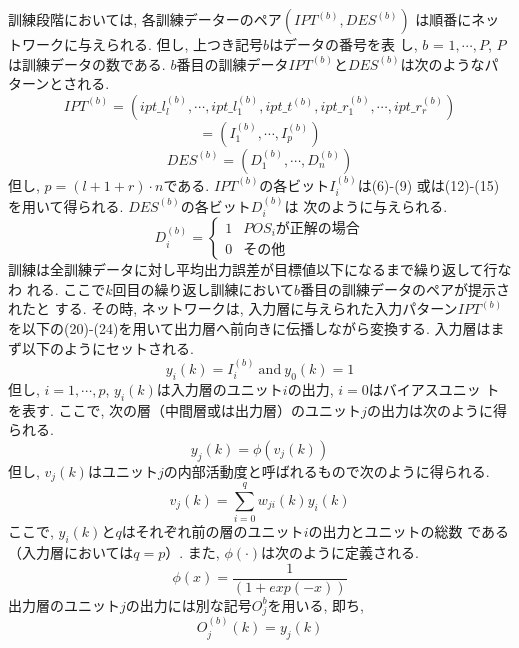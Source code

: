 訓練段階においては, 各訓練データーのペア$(IPT^{(b)}, DES^{(b)})$
は順番にネットワークに与えられる. 但し, 上つき記号$b$はデータの番号を表
し, $b$ = $1, \cdots, P$, $P$は訓練データの数である.
$b$番目の訓練データ$IPT^{(b)}$と$DES^{(b)}$は次のようなパターンとされる.
\[
IPT^{(b)}=(ipt\_l_{l}^{(b)}, \cdots, ipt\_l_{1}^{(b)}, ipt\_t^{(b)},
ipt\_r_{1}^{(b)}, \cdots, ipt\_r_{r}^{(b)})
\]
\begin{equation}
=(I^{(b)}_{1}, \cdots, I^{(b)}_{p})
\end{equation}
\begin{equation}
DES^{(b)}=(D^{(b)}_{1}, \cdots, D^{(b)}_{n})
\end{equation}
但し, $p = (l+1+r) \cdot n$である. $IPT^{(b)}$の各ビット$I^{(b)}_{i}$は(6)-(9)
或は(12)-(15)を用いて得られる.
$DES^{(b)}$の各ビット$D^{(b)}_{i}$は
次のように与えられる.
\begin{equation}
D^{(b)}_{i}=\left\{ \begin{array}{ll}
    1  &  \mbox{$POS_{i}$が正解の場合} \\
    0  &  \mbox{その他}
  \end{array}
\right.
\end{equation}
訓練は全訓練データに対し平均出力誤差が目標値以下になるまで繰り返して行なわ
れる. ここで$k$回目の繰り返し訓練において$b$番目の訓練データのペアが提示されたと
する. その時, ネットワークは, 入力層に与えられた入力パターン$IPT^{(b)}$
を以下の(20)-(24)を用いて出力層へ前向きに伝播しながら変換する.
入力層はまず以下のようにセットされる.
\begin{equation}
y_{i}(k)=I^{(b)}_{i} \ \mbox{and} \ y_{0}(k)=1
\end{equation}
但し, $i=1, \cdots, p$, 
$y_{i}(k)$は入力層のユニット$i$の出力, $i=0$はバイアスユニッ
トを表す. ここで, 次の層（中間層或は出力層）のユニット$j$の出力は次のように得
られる.
\begin{equation}
y_{j}(k)=\phi(v_{j}(k))
\end{equation}
但し, $v_{j}(k)$はユニット$j$の内部活動度と呼ばれるもので次のように得られる.
\begin{equation}
v_{j}(k)=\sum_{i=0}^{q}w_{ji}(k)y_{i}(k)
\end{equation}
ここで, $y_{i}(k)$と$q$はそれぞれ前の層のユニット$i$の出力とユニットの総数
である（入力層においては$q=p$）.
また, $\phi(\cdot)$は次のように定義される.
\begin{equation}
\phi(x)=\frac{1}{(1+exp(-x))}
\end{equation}
出力層のユニット$j$の出力には別な記号$O^{b}_{j}$を用いる, 即ち,
\begin{equation}
O^{(b)}_{j}(k)=y_{j}(k)
\end{equation}

